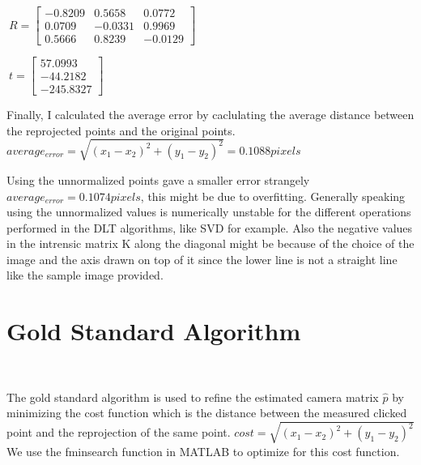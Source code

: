 \documentclass[]{article}
\begin{document}
\medskip
$\
R =
\begin{bmatrix}
-0.8209       & 0.5658  &   0.0772 \\
0.0709     & -0.0331 & 0.9969 \\
0.5666      & 0.8239 &  -0.0129
\end{bmatrix}$\newline
\newline

\medskip
$\
t =
\begin{bmatrix}
57.0993   \\
-44.2182  \\
-245.8327 
\end{bmatrix}$\newline

\medskip
Finally, I calculated the average error by caclulating the average distance between the reprojected points and the original points. 
$average_{error} = \sqrt{(x_1 - x_2)^2 + (y_1 - y_2)^2} = 0.1088 pixels$\newline

Using the unnormalized points gave a smaller error strangely $average_{error} = 0.1074 pixels$, this might be due to overfitting. Generally speaking using the unnormalized values is numerically unstable for the different operations performed in the DLT algorithms, like SVD for example. Also the negative values in the intrensic matrix K along the diagonal might be because of the choice of the image and the axis drawn on top of it since the lower line is not a straight line like the sample image provided.
\section{Gold Standard Algorithm}\

The gold standard algorithm is used to refine the estimated camera matrix $\hat{p}$ by minimizing the cost function which is the distance between the measured clicked point and the reprojection of the same point.
$cost = \sqrt{(x_1 - x_2)^2 + (y_1 - y_2)^2} $\newline
We use the fminsearch function in MATLAB to optimize for this cost function. 
\end{document}
